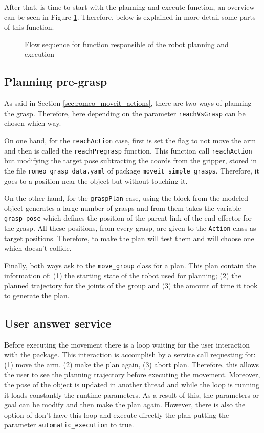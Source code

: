\documentclass[12pt,a4paper,final,twoside,openright]{report}
\begin{document}
After that, is time to start with the planning and execute function, an overview can be seen in Figure \ref{fig:plan_execute_function_flow}. Therefore, below is explained in more detail some parts of this function.

\begin{figure}[!h]
\centering

\caption{Flow sequence for function responsible of the robot planning and execution\label{fig:plan_execute_function_flow}}
\end{figure}

\subsection{Planning pre-grasp}
\label{sec:planning_pregrasp}

As said in Section \ref{sec:romeo_moveit_actions}, there are two ways of planning the grasp. Therefore, here depending on the parameter \texttt{reachVsGrasp} can be chosen which way. 

On one hand, for the \texttt{reachAction} case, first is set the flag to not move the arm and then is called the \texttt{reachPregrasp} function. This function call \texttt{reachAction} but modifying the target pose subtracting the coords from the gripper, stored in the file \texttt{romeo\_grasp\_data.yaml} of package \texttt{moveit\_simple\_grasps}. Therefore, it goes to a position near the object but without touching it.

On the other hand, for the \texttt{graspPlan} case, using the block from the modeled object generates a large number of grasps and from them takes the variable \texttt{grasp\_pose} which defines the position of the parent link of the end effector for the grasp. All these positions, from every grasp, are given to the \texttt{Action} class as target positions. Therefore, to make the plan will test them and will choose one which doesn't collide.

Finally, both ways ask to the \texttt{move\_group} class for a plan. This plan contain the information of: (1) the starting state of the robot used for planning; (2) the planned trajectory for the joints of the group and (3) the amount of time it took to generate the plan.

\subsection{User answer service}
\vspace{-10pt}
Before executing the movement there is a loop waiting for the user interaction with the package. This interaction is accomplish by a service call requesting for: (1) move the arm, (2) make the plan again, (3) abort plan. Therefore, this allows the user to see the planning trajectory before executing the movement. Moreover, the pose of the object is updated in another thread and while the loop is running it loads constantly the runtime parameters. As a result of this, the parameters or goal can be modify and then make the plan again. However, there is also the option of don't have this loop and execute directly the plan putting the parameter \texttt{automatic\_execution} to true. 
\end{document}

